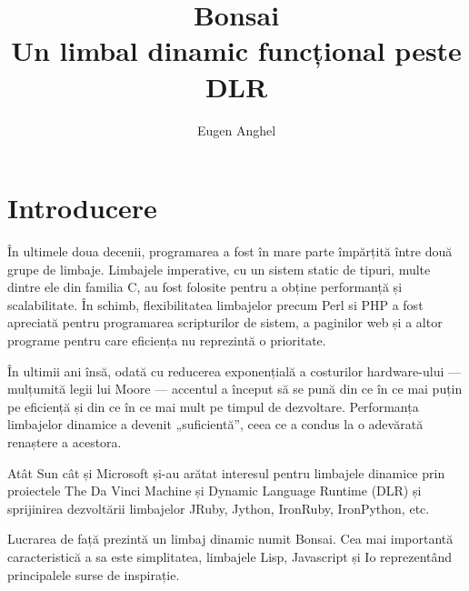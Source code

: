 \documentclass[12pt,a4paper]{memoir}
\title{Bonsai\\Un limbal dinamic funcțional peste DLR}
\author{Eugen Anghel}
\begin{document}
\newcommand{\draft}{\textcolor{red}}

\renewcommand{\thefootnote}{\fnsymbol{footnote}}

\renewcommand{\c}{\texttt}

\newenvironment{code}[1][]%
{%
\definecolor{shadecolor}{gray}{0.91}{#1}%
\topsep=0ex\relax
\shaded
\verbatim
}
{
\endverbatim
\endshaded
}

\maketitle

\newpage
\tableofcontents

\chapter{Introducere}

În ultimele doua decenii, programarea a fost în mare parte împărțită între două grupe de limbaje. Limbajele imperative, cu un sistem static de tipuri, multe dintre ele din familia C, au fost folosite pentru a obține performanță și scalabilitate. În schimb, flexibilitatea limbajelor precum Perl si PHP a fost apreciată pentru programarea scripturilor de sistem, a paginilor web și a altor programe pentru care eficiența nu reprezintă o prioritate.

În ultimii ani însă, odată cu reducerea exponențială a costurilor hardware-ului — mulțumită legii lui Moore — accentul a început să se pună din ce în ce mai puțin pe eficiență și din ce în ce mai mult pe timpul de dezvoltare. Performanța limbajelor dinamice a devenit „suficientă”, ceea ce a condus la o adevărată renaștere a acestora.

Atât Sun cât și Microsoft și-au arătat interesul pentru limbajele dinamice prin proiectele The Da Vinci Machine\cite{daVinciMachine} și Dynamic Language Runtime (DLR)\cite{dlr} și sprijinirea dezvoltării limbajelor JRuby\cite{jruby}, Jython\cite{jython}, IronRuby\cite{ironruby}, IronPython\cite{ironpython}, etc.

Lucrarea de față prezintă un limbaj dinamic numit Bonsai. Cea mai importantă caracteristică a sa este simplitatea, limbajele Lisp, Javascript și Io\cite{io} reprezentând principalele surse de inspirație.
\end{document}
